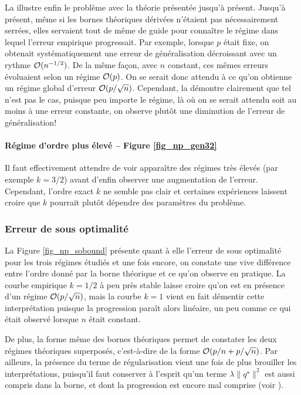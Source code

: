 La  illustre enfin le problème avec la théorie présentée jusqu'à
présent. Jusqu'à présent, même si les bornes théoriques dérivées n'étaient pas
nécessairement serrées, elles servaient tout de même de guide pour connaître le régime
dans lequel l'erreur empirique progressait. Par exemple, lorsque $p$ était fixe, on
obtenait systématiquement une erreur de généralisation décroissant avec un rythme
$\mathcal O(n^{-1/2})$. De la même façon, avec $n$ constant, ces mêmes erreurs évoluaient selon
un régime $\mathcal O(p)$. On se serait donc attendu à ce qu'on obtienne un régime global
d'erreur $\mathcal O(p/\sqrt{n})$. Cependant, la  démontre clairement
que tel n'est pas le cas, puisque peu importe le régime, là où on se serait attendu soit
au moins à une erreur constante, on observe plutôt une diminution de l'erreur de
généralisation!

\paragraph{Régime d'ordre plus élevé -- Figure \ref{fig_np_gen32}}

Il faut effectivement attendre de voir apparaître des régimes très élevés (par exemple
$k=3/2$) avant d'enfin observer une augmentation de l'erreur. Cependant, l'ordre exact $k$
ne semble pas clair et certaines expériences laissent croire que $k$ pourrait plutôt
dépendre des paramètres du problème.


\subsubsection{Erreur de sous optimalité}

La Figure \ref{fig_np_sobound} présente quant à elle l'erreur de sous optimalité pour les
trois régimes étudiés et une fois encore, on constate une vive différence entre l'ordre
donné par la borne théorique et ce qu'on observe en pratique. La courbe empirique $k=1/2$
à peu près stable laisse croire qu'on est en présence d'un régime $\mathcal O(p/\sqrt{n})$,
mais la courbe $k=1$ vient en fait démentir cette interprétation puisque la progression
paraît alors linéaire, un peu comme ce qui était observé lorsque $n$ était constant.

De plus, la forme même des bornes théoriques permet de constater les deux régimes
théoriques superposés, c'est-à-dire de la forme $\mathcal O(p/n + p/\sqrt{n})$. Par ailleurs,
la présence du terme de régularisation vient une fois de plus brouiller les
interprétations, puisqu'il faut conserver à l'esprit qu'un terme $\lambda\|q^\star\|^2$ est aussi compris
dans la borne, et dont la progression est encore mal comprise (voir ).


